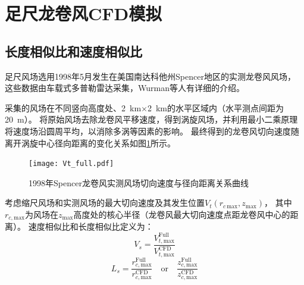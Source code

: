 

\section{足尺龙卷风CFD模拟}
\subsection{长度相似比和速度相似比}
足尺风场选用1998年5月发生在美国南达科他州Spencer地区的实测龙卷风风场，
这些数据由车载式多普勒雷达采集，Wurman等人有详细的介绍\cite{wurman2002multiple}\cite{alexander2005spencer}\cite{wurman2005spencer}。

采集的风场在不同竖向高度处、\SI{2}{km}$\times$\SI{2}{km}的水平区域内（水平测点间距为\SI{20}{m}）。
将原始风场去除龙卷风平移速度，得到涡旋风场，并利用最小二乘原理将速度场沿圆周平均，以消除多涡等因素的影响。
最终得到的龙卷风切向速度随离开涡旋中心径向距离的变化关系如图\ref{fig:Vt-full}所示。
\begin{figure}[!htbp]
	\centering
	\texttt{[image: Vt\_full.pdf]}
	\caption{1998年Spencer龙卷风实测风场切向速度与径向距离关系曲线\cite{sarkar2005velocity}}
	\label{fig:Vt-full}
\end{figure}

考虑缩尺风场和实测风场的最大切向速度及其发生位置$V_t(r_{c\,\mathrm{max}}, z_{\mathrm{max}})$，
其中$r_{c,\mathrm{max}}$为风场在$z_{\mathrm{max}}$高度处的核心半径（龙卷风最大切向速度点距龙卷风中心的距离）。
速度相似比和长度相似比定义为\cite{hangan2008swirl}：
\begin{equation}
	V_s  =  \frac{V_{t,\mathrm{max}}^{\text{Full}}}{V_{t,\mathrm{max}}^{\text{CFD}}}
\end{equation}
\begin{equation}
	L_s  =  \frac{r_{c,\mathrm{max}}^{\text{Full}}}{r_{c,\mathrm{max}}^{\text{CFD}}} \quad \text{or} \quad \frac{z_{c,\mathrm{max}}^{\text{Full}}}{z_{c,\mathrm{max}}^{\text{CFD}}}
\end{equation}

